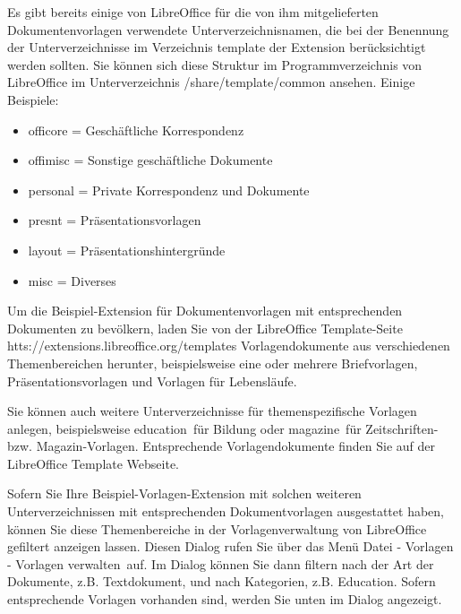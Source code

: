 \documentclass[a4paper,10pt,pagesize,titlepage]{scrbook}
\begin{document}
Es gibt bereits einige von LibreOffice für die von ihm mitgelieferten Dokumentenvorlagen verwendete Unterverzeichnisnamen, die bei der Benennung der Unterverzeichnisse im Verzeichnis template der Extension berücksichtigt werden sollten. Sie können sich diese Struktur im Programmverzeichnis von LibreOffice im Unterverzeichnis /share/template/common ansehen. Einige Beispiele:
\begin{itemize}
	\item officore = Geschäftliche Korrespondenz
	\item offimisc = Sonstige geschäftliche Dokumente
	\item personal = Private Korrespondenz und Dokumente
	\item presnt = Präsentationsvorlagen
	\item layout = Präsentationshintergründe
	\item misc = Diverses
\end{itemize}

Um die Beispiel-Extension für Dokumentenvorlagen mit entsprechenden Dokumenten zu bevölkern, laden Sie von der LibreOffice Template-Seite htts://extensions.libreoffice.org/templates Vorlagendokumente aus verschiedenen Themenbereichen herunter, beispielsweise eine oder mehrere Briefvorlagen, Präsentationsvorlagen und Vorlagen für Lebensläufe.

Sie können auch weitere Unterverzeichnisse für themenspezifische Vorlagen anlegen, beispielsweise \glqq education\grqq~für Bildung oder \glqq magazine\grqq~für Zeitschriften- bzw. Magazin-Vorlagen. Entsprechende Vorlagendokumente finden Sie auf der LibreOffice Template Webseite.

Sofern Sie Ihre Beispiel-Vorlagen-Extension mit solchen weiteren Unterverzeichnissen mit entsprechenden Dokumentvorlagen ausgestattet haben, können Sie diese Themenbereiche in der Vorlagenverwaltung von LibreOffice gefiltert anzeigen lassen. Diesen Dialog rufen Sie über das Menü \glqq Datei - Vorlagen - Vorlagen verwalten\grqq~auf. Im Dialog können Sie dann filtern nach der Art der Dokumente, z.B. Textdokument, und nach Kategorien, z.B. Education. Sofern entsprechende Vorlagen vorhanden sind, werden Sie unten im Dialog angezeigt.
\end{document}
